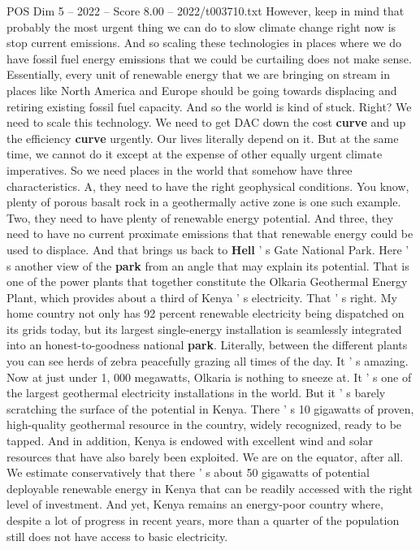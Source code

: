 \begin{textsample}{POS Dim 5 – 2022 – Score 8.00 – 2022/t003710.txt}
However, keep in mind that probably the most urgent thing we can do to slow climate change right now is stop current emissions.
And so scaling these technologies in places where we do have fossil fuel energy emissions that we could be curtailing does not make sense.
Essentially, every unit of renewable energy that we are bringing on stream in places like North America and Europe should be going towards displacing and retiring existing fossil fuel capacity.
And so the world is kind of stuck.
Right?
We need to scale this technology.
We need to get DAC down the cost \textbf{curve} and up the efficiency \textbf{curve} urgently.
Our lives literally depend on it.
But at the same time, we cannot do it except at the expense of other equally urgent climate imperatives.
So we need places in the world that somehow have three characteristics.
A, they need to have the right geophysical conditions.
You know, plenty of porous basalt rock in a geothermally active zone is one such example.
Two, they need to have plenty of renewable energy potential.
And three, they need to have no current proximate emissions that that renewable energy could be used to displace.
And that brings us back to \textbf{Hell} ' s Gate National Park.
Here ' s another view of the \textbf{park} from an angle that may explain its potential.
That is one of the power plants that together constitute the Olkaria Geothermal Energy Plant, which provides about a third of Kenya ' s electricity.
That ' s right.
My home country not only has 92 percent renewable electricity being dispatched on its grids today, but its largest single-energy installation is seamlessly integrated into an honest-to-goodness national \textbf{park}.
Literally, between the different plants you can see herds of zebra peacefully grazing all times of the day.
It ' s amazing.
Now at just under 1, 000 megawatts, Olkaria is nothing to sneeze at.
It ' s one of the largest geothermal electricity installations in the world.
But it ' s barely scratching the surface of the potential in Kenya.
There ' s 10 gigawatts of proven, high-quality geothermal resource in the country, widely recognized, ready to be tapped.
And in addition, Kenya is endowed with excellent wind and solar resources that have also barely been exploited.
We are on the equator, after all.
We estimate conservatively that there ' s about 50 gigawatts of potential deployable renewable energy in Kenya that can be readily accessed with the right level of investment.
And yet, Kenya remains an energy-poor country where, despite a lot of progress in recent years, more than a quarter of the population still does not have access to basic electricity.

\end{textsample}
